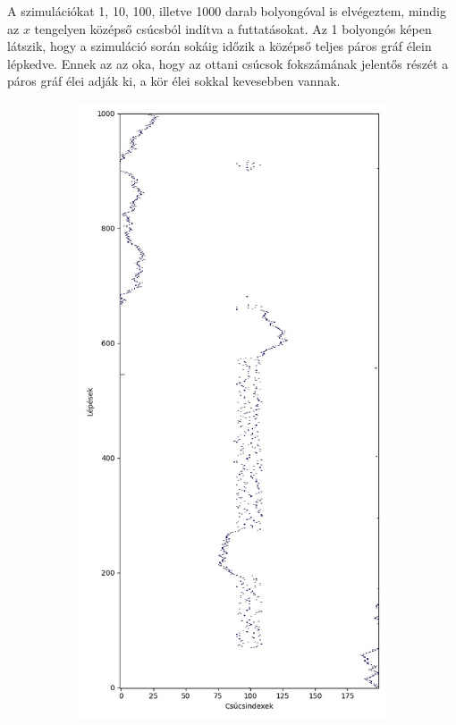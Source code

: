 A szimulációkat 1, 10, 100, illetve 1000 darab bolyongóval is elvégeztem,
mindig az $x$ tengelyen középső csúcsból indítva a futtatásokat. Az 1 bolyongós
képen látszik, hogy a szimuláció során sokáig időzik a középső teljes páros
gráf élein lépkedve. Ennek az az oka, hogy az ottani csúcsok fokszámának
jelentős részét a páros gráf élei adják ki, a kör élei sokkal kevesebben
vannak.

\begin{figure}[H]
  \centering
  \begin{subfigure}{.4\linewidth}
    \centering
    \includegraphics[width=\linewidth]{./figures/sulyzo/sim00.jpg}

\end{subfigure}
\end{figure}
